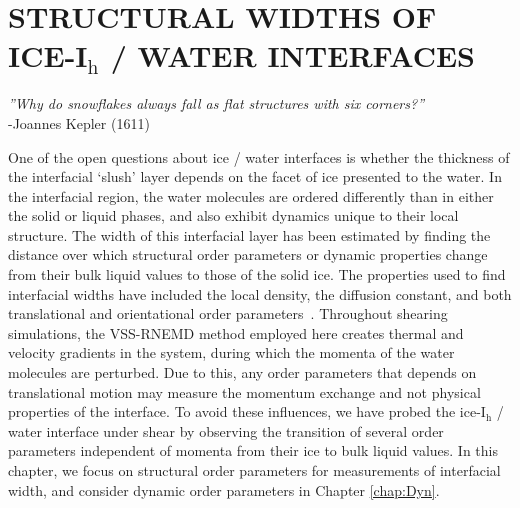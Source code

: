 
\chapter{STRUCTURAL WIDTHS OF ICE-I$_\mathrm{h}$ / WATER
  INTERFACES}\label{chap:Str}


\begin{flushright}
\textit{''Why do snowflakes always fall as flat structures with six corners?''} \\
-Joannes Kepler (1611) \\
\end{flushright}

One of the open questions about ice / water interfaces is whether the
thickness of the interfacial `slush' layer depends on the facet of ice
presented to the water. In the interfacial region, the water molecules
are ordered differently than in either the solid or liquid phases, and
also exhibit dynamics unique to their local structure.  The width of
this interfacial layer has been estimated by finding the distance over
which structural order parameters or dynamic properties change from
their bulk liquid values to those of the solid ice. The properties
used to find interfacial widths have included the local density, the
diffusion constant, and both translational and orientational order
parameters~\cite{Karim1988,Karim1990,Hayward2001,Hayward2002,Bryk2002,Gay2002,Louden2013a}. Throughout
shearing simulations, the VSS-RNEMD method employed here creates
thermal and velocity gradients in the system, during which the momenta
of the water molecules are perturbed. Due to this, any order parameters that
depends on translational motion may measure the momentum exchange and
not physical properties of the interface. To avoid these influences,
we have probed the ice-I$_\mathrm{h}$ / water interface under shear by
observing the transition of several order parameters independent of
momenta from their ice to bulk liquid values.  In this chapter, we
focus on structural order parameters for measurements of interfacial
width, and consider dynamic order parameters in Chapter
\ref{chap:Dyn}.

